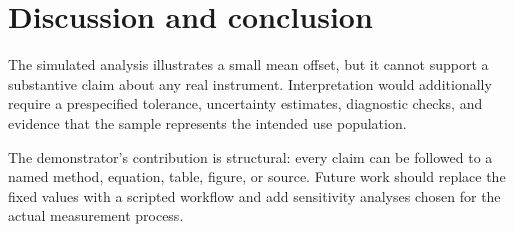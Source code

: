\chapter{Discussion and conclusion}
\label{chap:conclusion}

The simulated analysis illustrates a small mean offset, but it cannot support a
substantive claim about any real instrument. Interpretation would additionally
require a prespecified tolerance, uncertainty estimates, diagnostic checks,
and evidence that the sample represents the intended use population.

The demonstrator's contribution is structural: every claim can be followed to
a named method, equation, table, figure, or source. Future work should replace
the fixed values with a scripted workflow and add sensitivity analyses chosen
for the actual measurement process.
